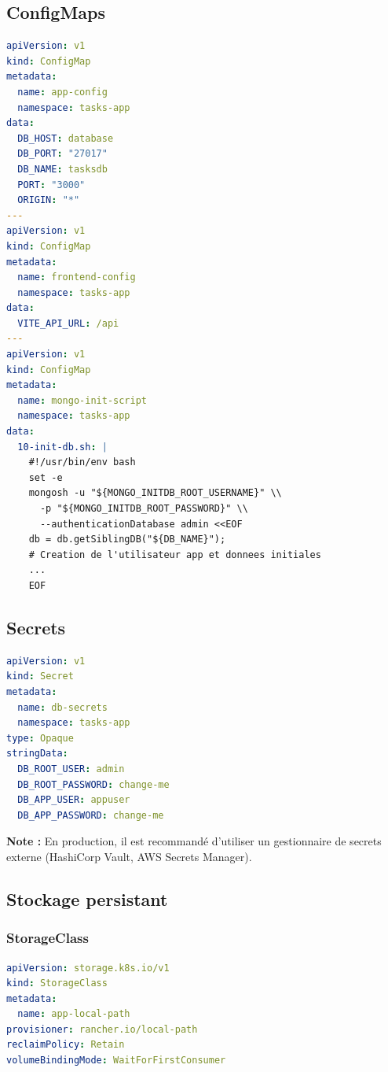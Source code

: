 \documentclass[12pt,a4paper]{report}
\begin{document}
\subsection{ConfigMaps}

\begin{lstlisting}[language=yaml,caption=configmap.yaml]
apiVersion: v1
kind: ConfigMap
metadata:
  name: app-config
  namespace: tasks-app
data:
  DB_HOST: database
  DB_PORT: "27017"
  DB_NAME: tasksdb
  PORT: "3000"
  ORIGIN: "*"
---
apiVersion: v1
kind: ConfigMap
metadata:
  name: frontend-config
  namespace: tasks-app
data:
  VITE_API_URL: /api
---
apiVersion: v1
kind: ConfigMap
metadata:
  name: mongo-init-script
  namespace: tasks-app
data:
  10-init-db.sh: |
    #!/usr/bin/env bash
    set -e
    mongosh -u "${MONGO_INITDB_ROOT_USERNAME}" \\
      -p "${MONGO_INITDB_ROOT_PASSWORD}" \\
      --authenticationDatabase admin <<EOF
    db = db.getSiblingDB("${DB_NAME}");
    # Creation de l'utilisateur app et donnees initiales
    ...
    EOF
\end{lstlisting}

\subsection{Secrets}

\begin{lstlisting}[language=yaml,caption=secret.yaml]
apiVersion: v1
kind: Secret
metadata:
  name: db-secrets
  namespace: tasks-app
type: Opaque
stringData:
  DB_ROOT_USER: admin
  DB_ROOT_PASSWORD: change-me
  DB_APP_USER: appuser
  DB_APP_PASSWORD: change-me
\end{lstlisting}

\textbf{Note :} En production, il est recommandé d'utiliser un gestionnaire de secrets externe (HashiCorp Vault, AWS Secrets Manager).

\subsection{Stockage persistant}

\subsubsection{StorageClass}

\begin{lstlisting}[language=yaml,caption=storageclass.yaml]
apiVersion: storage.k8s.io/v1
kind: StorageClass
metadata:
  name: app-local-path
provisioner: rancher.io/local-path
reclaimPolicy: Retain
volumeBindingMode: WaitForFirstConsumer
\end{lstlisting}
\end{document}
